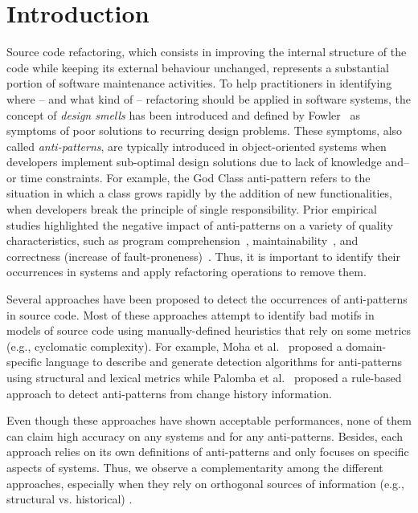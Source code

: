 \section{Introduction}
Source code refactoring, which consists in improving the internal structure of the code while keeping its external behaviour unchanged, represents a substantial portion of software maintenance activities.
To help practitioners in identifying where -- and what kind of -- refactoring should be applied in software systems, the concept of \textit{design smells} has been introduced and defined by Fowler~\cite{Fowler1999} as symptoms of poor solutions to recurring design problems. These symptoms, also called \textit{anti-patterns}, are typically introduced in object-oriented systems when developers implement sub-optimal design solutions due to lack of knowledge and--or time constraints. For example, the God Class anti-pattern refers to the situation in which a class grows rapidly by the addition of new functionalities, when developers break the principle of single responsibility. Prior empirical studies highlighted the negative impact of anti-patterns on a variety of quality characteristics, such as program comprehension~\cite{abbes2011empirical}, maintainability~\cite{yamashita2013exploring}, and correctness (increase of fault-proneness)~\cite{khomh2012exploratory}. Thus, it is important to identify their occurrences in systems and apply refactoring operations to remove them.

Several approaches have been proposed to detect the occurrences of anti-patterns in source code. Most of these approaches attempt to identify bad motifs in models of source code using manually-defined heuristics that rely on some metrics (e.g., cyclomatic complexity). For example, Moha et al.~\cite{Moha10-TSE-DECOR} proposed a domain-specific language to describe and generate detection algorithms for anti-patterns using structural and lexical metrics while Palomba et al.~\cite{PalombaBPOLP13,Palomba15} proposed a rule-based approach to detect anti-patterns from change history information.

Even though these approaches have shown acceptable performances, none of them can claim high accuracy on any systems and for any anti-patterns. Besides, each approach relies on its own definitions of anti-patterns and only focuses on specific aspects of systems. Thus, we observe a complementarity among the different approaches, especially when they rely on orthogonal sources of information (e.g., structural vs. historical) \cite{fontana2012automatic, PalombaBPOLP13}.

